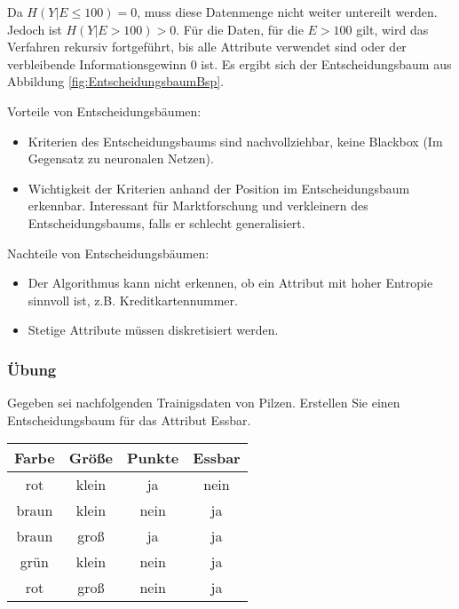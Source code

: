 Da \(H(Y|E \leq 100) = 0\), muss diese Datenmenge nicht weiter untereilt werden.
Jedoch ist \(H(Y|E > 100) > 0\).
Für die Daten, für die \(E>100\) gilt, wird das Verfahren rekursiv fortgeführt, bis alle Attribute verwendet sind oder der verbleibende Informationsgewinn 0 ist.
Es ergibt sich der Entscheidungsbaum aus Abbildung \ref{fig:EntscheidungsbaumBsp}.

Vorteile von Entscheidungsbäumen:
\begin{itemize}
	\item Kriterien des Entscheidungsbaums sind nachvollziehbar, keine Blackbox (Im Gegensatz zu neuronalen Netzen). 
	\item Wichtigkeit der Kriterien anhand der Position im Entscheidungsbaum erkennbar.
		Interessant für Marktforschung und verkleinern des Entscheidungsbaums, falls er schlecht generalisiert.
\end{itemize}
Nachteile von Entscheidungsbäumen:
\begin{itemize}
	\item Der Algorithmus kann nicht erkennen, ob ein Attribut mit hoher Entropie sinnvoll ist, z.B. Kreditkartennummer.
	\item Stetige Attribute müssen diskretisiert werden.
\end{itemize}

\subsubsection{Übung}
Gegeben sei nachfolgenden Trainigsdaten von Pilzen.
Erstellen Sie einen Entscheidungsbaum für das Attribut Essbar.
\begin{table}[htbp]
	\centering
	\begin{tabular}{cccc}
		\toprule
		\textbf{Farbe} & \textbf{Größe} & \textbf{Punkte} & \textbf{Essbar}	\\
		\midrule
		rot & klein & ja & nein\\
		braun & klein & nein & ja\\
		braun & groß & ja & ja\\
		grün & klein & nein & ja\\
		rot & groß & nein & ja	\\
		\bottomrule
	\end{tabular}
\end{table}

